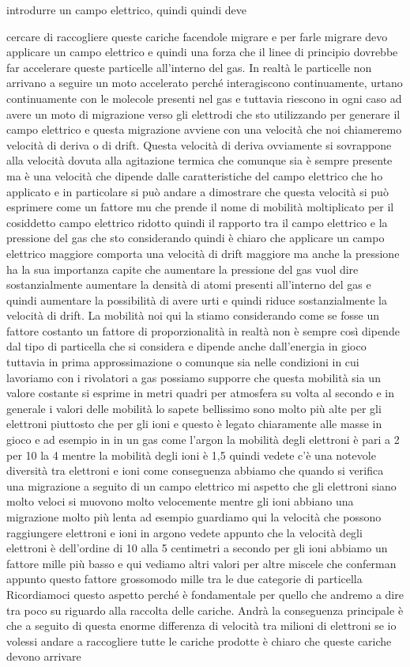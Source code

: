 introdurre un campo elettrico, quindi quindi deve 

cercare di raccogliere queste cariche facendole migrare e per farle migrare devo applicare un campo elettrico e quindi una forza che il linee di principio dovrebbe far accelerare queste particelle all'interno del gas. In realtà le particelle non arrivano a seguire un moto accelerato perché interagiscono continuamente, urtano continuamente con le molecole presenti nel gas e tuttavia riescono in ogni caso ad avere un moto di migrazione verso gli elettrodi che sto utilizzando per generare il campo elettrico e questa migrazione avviene con una velocità che noi chiameremo velocità di deriva o di drift. Questa velocità di deriva ovviamente si sovrappone alla velocità dovuta alla agitazione termica che comunque sia è sempre presente ma è una velocità che dipende dalle caratteristiche del campo elettrico che ho applicato e in particolare si può andare a dimostrare che questa velocità si può esprimere come un fattore mu che prende il nome di mobilità moltiplicato per il cosiddetto campo elettrico ridotto quindi il rapporto tra il campo elettrico e la pressione del gas che sto considerando quindi è chiaro che applicare un campo elettrico maggiore comporta una velocità di drift maggiore ma anche la pressione ha la sua importanza capite che aumentare la pressione del gas vuol dire sostanzialmente aumentare la densità di atomi presenti all'interno del gas e quindi aumentare la possibilità di avere urti e quindi riduce sostanzialmente la velocità di drift. La mobilità noi qui la stiamo considerando come se fosse un fattore costanto un fattore di proporzionalità in realtà non è sempre così dipende dal tipo di particella che si considera e dipende anche dall'energia in gioco tuttavia in prima approssimazione o comunque sia nelle condizioni in cui lavoriamo con i rivolatori a gas possiamo supporre che questa mobilità sia un valore costante si esprime in metri quadri per atmosfera su volta al secondo e in generale i valori delle mobilità lo sapete bellissimo sono molto più alte per gli elettroni piuttosto che per gli ioni e questo è legato chiaramente alle masse in gioco e ad esempio in in un gas come l'argon la mobilità degli elettroni è pari a 2 per 10 la 4 mentre la mobilità degli ioni è 1,5 quindi vedete c'è una notevole diversità tra elettroni e ioni come conseguenza abbiamo che quando si verifica una migrazione a seguito di un campo elettrico mi aspetto che gli elettroni siano molto veloci si muovono molto velocemente mentre gli ioni abbiano una migrazione molto più lenta ad esempio guardiamo qui la velocità che possono raggiungere elettroni e ioni in argono vedete appunto che la velocità degli elettroni è dell'ordine di 10 alla 5 centimetri a secondo per gli ioni abbiamo un fattore mille più basso e qui vediamo altri valori per altre miscele che conferman appunto questo fattore grossomodo mille tra le due categorie di particella Ricordiamoci questo aspetto perché è fondamentale per quello che andremo a dire tra poco su riguardo alla raccolta delle cariche. Andrà la conseguenza principale è che a seguito di questa enorme differenza di velocità tra milioni di elettroni se io volessi andare a raccogliere tutte le cariche prodotte è chiaro che queste cariche devono arrivare 